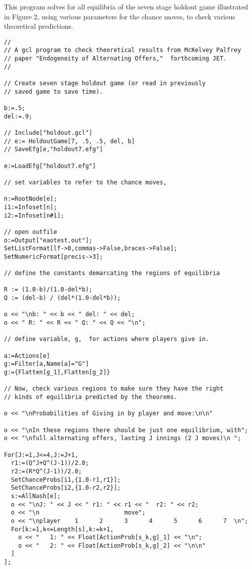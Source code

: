 \noindent
This program solves for all equilibria of the seven stage holdout game
illustrated in Figure 2, using various parameters for the chance
moves, to check various theoretical predictions. 
{\scriptsize
\begin{verbatim}
//
// A gcl program to check theoretical results from McKelvey Palfrey 
// paper "Endogeneity of Alternating Offers,"  forthcoming JET.  
//

// Create seven stage holdout game (or read in previously
// saved game to save time). 

b:=.5;
del:=.9;

// Include["holdout.gcl"]
// e:= HoldoutGame[7, .5, .5, del, b]
// SaveEfg[e,"holdout7.efg"]

e:=LoadEfg["holdout7.efg"]

// set variables to refer to the chance moves, 

n:=RootNode[e];
i1:=Infoset[n];
i2:=Infoset[n#1];

// open outfile 
o:=Output["eaotest.out"];
SetListFormat[lf->0,commas->False,braces->False];
SetNumericFormat[precis->3];

// define the constants demarcating the regions of equilibria

R := (1.0-b)/(1.0-del*b);
Q := (del-b) / (del*(1.0-del*b));

o << "\nb: " << b << " del: " << del;
o << " R: " << R << " Q: " << Q << "\n";

// define variable, g,  for actions where players give in.  

a:=Actions[e]
g:=Filter[a,Name[a]="G"]
g:={Flatten[g_1],Flatten[g_2]}

// Now, check various regions to make sure they have the right 
// kinds of equilibria predicted by the theorems.  

o << "\nProbabilities of Giving in by player and move:\n\n"

o << "\nIn these regions there should be just one equilibrium, with";
o << "\nfull alternating offers, lasting J innings (2 J moves)\n ";

For[J:=1,J<=4,J:=J+1,
  r1:=(Q^J+Q^(J-1))/2.0;
  r2:=(R*Q^(J-1))/2.0;
  SetChanceProbs[i1,{1.0-r1,r1}];
  SetChanceProbs[i2,{1.0-r2,r2}];
  s:=AllNash[e];
  o << "\nJ: " << J << " r1: " << r1 << "  r2: " << r2;
  o << "\n                        move";
  o << "\nplayer    1      2      3      4      5      6      7  \n"; 
  For[k:=1,k<=Length[s],k:=k+1,
    o << "   1: " << Float[ActionProb[s_k,g]_1] << "\n";
    o << "   2: " << Float[ActionProb[s_k,g]_2] << "\n\n"
  ]
];


\end{verbatim}}
